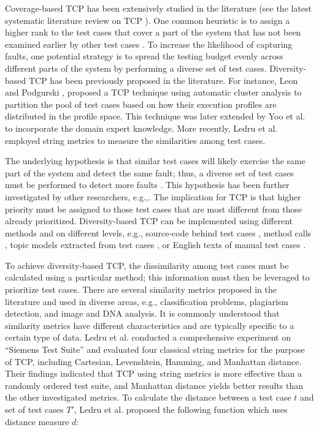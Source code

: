 \documentclass[1p]{elsarticle}
\begin{document}
Coverage-based TCP has been extensively studied in the literature (see the latest systematic literature review on TCP \cite{khatibsyarbini2017test}). One common heuristic is to assign a higher rank to the test cases that cover a part of the system that has not been examined earlier by other test cases \cite{rothermel2001prioritizing}. To increase the likelihood of capturing faults, one potential strategy is to spread the testing budget evenly across different parts of the system by performing a diverse set of test cases. Diversity-based TCP has been previously proposed in the literature. For instance, Leon and Podgurski \cite{leon2003comparison}, proposed a TCP technique using automatic cluster analysis to partition the pool of test cases based on how their execution profiles are distributed in the profile space. This technique was later extended by Yoo et al. \cite{yoo2009clustering} to incorporate the domain expert knowledge. More recently, Ledru et al. \cite{ledru2012prioritizing} employed string metrics to measure the similarities among test cases. 

The underlying hypothesis is that similar test cases will likely exercise the same part of the system and detect the same fault; thus, a diverse set of test cases must be performed to detect more faults \cite{jiang2009adaptive}. This hypothesis has been further investigated by other researchers, e.g.,\cite{cartaxo2011use,hemmati2010reducing,hemmati2011empirical,hemmati2013achieving,hemmati2017prioritizing,ledru2012prioritizing,arafeen2013test,thomas2014static}. The implication for TCP is that higher priority must be assigned to those test cases that are most different from those already prioritized. Diversity-based TCP can be implemented using different methods and on different levels, e.g., source-code behind test cases \cite{ledru2012prioritizing}, method calls \cite{hemmati2013achieving}, topic models extracted from test cases \cite{thomas2014static}, or English texts of manual test cases \cite{hemmati2017prioritizing}. 

To achieve diversity-based TCP, the dissimilarity among test cases must be calculated using a particular method; this information must then be leveraged to prioritize test cases. There are several similarity metrics proposed in the literature and used in diverse areas, e.g., classification problems, plagiarism detection, and image and DNA analysis. It is commonly understood that similarity metrics have different characteristics and are typically specific to a certain type of data. Ledru et al. \cite{ledru2012prioritizing} conducted a comprehensive experiment on \enquote{Siemens Test Suite} and evaluated four classical string metrics for the purpose of TCP, including Cartesian, Levenshtein, Hamming, and Manhattan distance. Their findings indicated that TCP using string metrics is more effective than a randomly ordered test suite, and Manhattan distance yields better results than the other investigated metrics. To calculate the distance between a test case $t$ and set of test cases $T'$, Ledru et al. proposed the following function which uses distance measure $d$:
\end{document}
